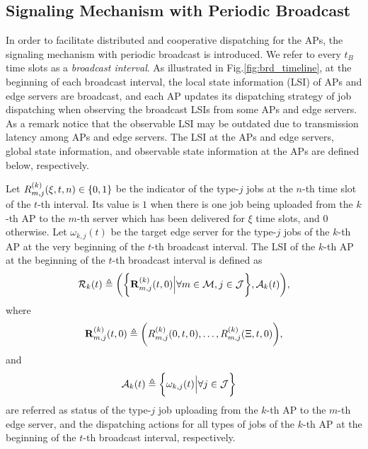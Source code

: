 \subsection{Signaling Mechanism with Periodic Broadcast}
\label{subsec:broadcast}
In order to facilitate distributed and cooperative dispatching for the APs, {the signaling mechanism with periodic broadcast is introduced.}
We refer to every $t_B$ time slots as a \emph{broadcast interval}.
As illustrated in Fig.\ref{fig:brd_timeline}, at the beginning of each broadcast interval, the local state information (LSI) of APs and edge servers are broadcast, and each AP updates its dispatching strategy of job dispatching when observing the broadcast LSIs from some APs and edge servers.
As a remark notice that the observable LSI may be outdated due to transmission latency among APs and edge servers.
The LSI at the APs and edge servers, global state information, and observable state information at the APs are defined below, respectively.

\begin{definition}
    Let $R^{(k)}_{m,j}(\xi,t,n) \in \{0,1\}$ be the indicator of the type-$j$ jobs at the $n$-th time slot of the $t$-th interval.
    Its value is $1$ when there is one job being uploaded from the $k$-th AP to the $m$-th server which has been delivered for $\xi$ time slots, and $0$ otherwise.
    Let $\omega_{k,j}(t)$ be the target edge server for the type-$j$ jobs of the $k$-th AP at the very beginning of the $t$-th broadcast interval.
    The LSI of the $k$-th AP at the beginning of the $t$-th broadcast interval is defined as
    {\small
    \begin{align}
        \mathcal{R}_{k}(t) \triangleq
        \bigg(
            \bigg\{\mathbf{R}^{(k)}_{m,j}(t,0) \Big| \forall m\in\mathcal{M},j\in\mathcal{J}\bigg\},
            \mathcal{A}_{k}(t)
        \bigg),
    \end{align}
    }%
    where
    {\small
    \begin{align}
        \mathbf{R}^{(k)}_{m,j}(t,0) \triangleq \bigg(
            R^{(k)}_{m,j}(0,t,0), \dots, R^{(k)}_{m,j}(\Xi,t,0)
        \bigg),
    \end{align}
    }%
    and
    {\small
    \begin{align}
        \mathcal{A}_{k}(t) &\triangleq \bigg\{\omega_{k,j}(t) \Big| \forall j\in\mathcal{J}\bigg\}
    \end{align}
    }%
    are referred as status of the type-$j$ job uploading from the $k$-th AP to the $m$-th edge server, and the dispatching actions for all types of jobs of the $k$-th AP at the beginning of the $t$-th broadcast interval, respectively.
\end{definition}

